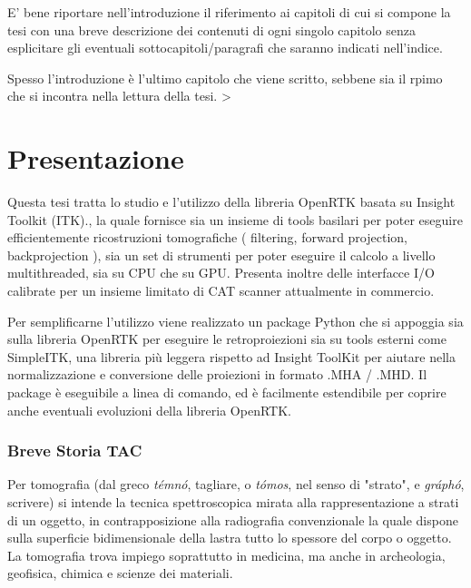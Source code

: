 \documentclass[a4paper,11pt, oneside]{article}
\begin{document}
        		E' bene riportare nell'introduzione il riferimento ai capitoli di cui si compone la tesi con una breve descrizione dei contenuti di ogni singolo capitolo senza esplicitare gli eventuali sottocapitoli/paragrafi che saranno indicati nell'indice.
        
        		Spesso l'introduzione è l'ultimo capitolo che viene scritto, sebbene sia il rpimo che si incontra nella lettura della tesi.
        	>
    
    \newpage
    \tableofcontents
    
    \part{Presentazione}
        \par
            Questa tesi tratta lo studio e l'utilizzo della libreria OpenRTK \cite{openrtk-website} basata su Insight Toolkit (ITK).\cite{itk-website}, la quale fornisce sia un insieme di tools basilari per poter eseguire efficientemente ricostruzioni tomografiche ( filtering, forward projection, backprojection ), sia un set di strumenti per poter eseguire il calcolo a livello multithreaded, sia su CPU che su GPU. Presenta inoltre delle interfacce I/O calibrate per un insieme limitato di CAT scanner attualmente in commercio.
    
        \par
            Per semplificarne l'utilizzo viene realizzato un package Python che si appoggia sia sulla libreria OpenRTK per eseguire le retroproiezioni sia su tools esterni come SimpleITK, una libreria più leggera rispetto ad Insight ToolKit per aiutare nella normalizzazione e conversione delle proiezioni in formato .MHA / .MHD.
            Il package è eseguibile a linea di comando, ed è facilmente estendibile per coprire anche eventuali evoluzioni della libreria OpenRTK.
    
        \par
            [TODO nella sezione X si fa Y etc bla di blabla, il secondo di blabla]
          
        \newpage
        \section{Breve Storia TAC}
            \par
                Per tomografia (dal greco \textit{témnó}, tagliare, o \textit{tómos}, nel senso di "strato", e \textit{gráphó}, scrivere) si intende la tecnica spettroscopica mirata alla rappresentazione a strati di un oggetto, in contrapposizione alla radiografia convenzionale la quale dispone sulla superficie bidimensionale della lastra tutto lo spessore del corpo o oggetto.\\
                La tomografia trova impiego soprattutto in medicina, ma anche in archeologia, geofisica, chimica e scienze dei materiali.
                
\end{document}
